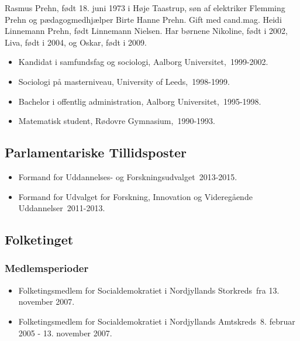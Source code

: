 \documentclass[11pt, a4paper]{awesome-cv}
\begin{document}
\makecvheader[R]
\makelettertitle
\begin{cvletter}
Rasmus Prehn, født 18. juni 1973 i Høje Taastrup, søn af elektriker Flemming Prehn og pædagogmedhjælper Birte Hanne Prehn. Gift med cand.mag. Heidi Linnemann Prehn, født Linnemann Nielsen. Har børnene Nikoline, født i 2002, Liva, født i 2004, og Oskar, født i 2009.

\begin{itemize}
\item Kandidat i samfundsfag og sociologi, Aalborg Universitet, 1999-2002.
\item Sociologi på masterniveau, University of Leeds, 1998-1999.
\item Bachelor i offentlig administration, Aalborg Universitet, 1995-1998.
\item Matematisk student, Rødovre Gymnasium, 1990-1993.
\end{itemize}
\subsection*{Parlamentariske Tillidsposter}
\begin{itemize}
\item Formand for Uddannelses- og Forskningsudvalget 2013-2015.
\item Formand for Udvalget for Forskning, Innovation og Videregående Uddannelser 2011-2013.
\end{itemize}
\subsection*{Folketinget}
\subsubsection*{Medlemsperioder}
\begin{itemize}
\item Folketingsmedlem for Socialdemokratiet i Nordjyllands Storkreds fra 13. november 2007.
\item Folketingsmedlem for Socialdemokratiet i Nordjyllands Amtskreds 8. februar 2005 - 13. november 2007.
\end{itemize}

\end{cvletter}
\end{document}

